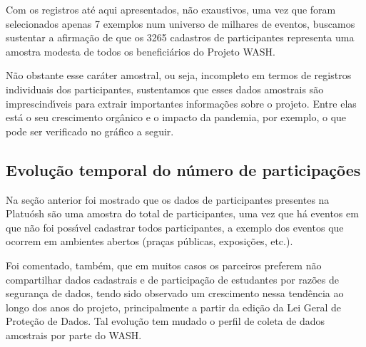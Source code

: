\documentclass[
12pt,		%
openright,	%
twoside,  %
a4paper,			%
chapter=TITLE,		%
english,			%
french,				%
spanish,			%
brazil				%
]{USPSC-classe/USPSC}
\begin{document}
Com os registros at\'e aqui apresentados, n\~ao exaustivos, uma vez que foram selecionados apenas 7 exemplos num universo de milhares de eventos, buscamos sustentar a afirma\c{c}\~ao de que os 3265 cadastros de participantes representa uma amostra modesta de todos os benefici\'arios do Projeto WASH.














N\~ao obstante esse car\'ater amostral, ou seja, incompleto em termos de registros individuais dos participantes, sustentamos que esses dados amostrais s\~ao imprescind\'{\i}veis para extrair importantes informa\c{c}\~oes sobre o projeto. Entre elas est\'a o seu crescimento org\^anico e o impacto da pandemia, por exemplo, o que pode ser verificado no gr\'afico a seguir.














\subsection[Evolu\c{c}\~ao temporal do n\'umero de participa\c{c}\~oes]{Evolu\c{c}\~ao temporal do n\'umero de participa\c{c}\~oes}\label{Evolu\c{c}\~ao temporal do n\'umero de participa\c{c}\~oes}
Na se\c{c}\~ao anterior foi mostrado que os dados de participantes presentes na Platu\'osh s\~ao uma amostra do total de participantes, uma vez que h\'a eventos em que n\~ao foi poss\'{\i}vel cadastrar todos participantes, a exemplo dos eventos que ocorrem em ambientes abertos (pra\c{c}as p\'ublicas, exposi\c{c}\~oes, etc.).














Foi comentado, tamb\'em, que em muitos casos os parceiros preferem n\~ao compartilhar dados cadastrais e de participa\c{c}\~ao de estudantes por raz\~oes de seguran\c{c}a de dados, tendo sido observado um crescimento nessa tend\^encia ao longo dos anos do projeto, principalmente a partir da edi\c{c}\~ao da Lei Geral de Prote\c{c}\~ao de Dados. Tal evolu\c{c}\~ao tem mudado o perfil de coleta de dados amostrais por parte do WASH.
\end{document}
